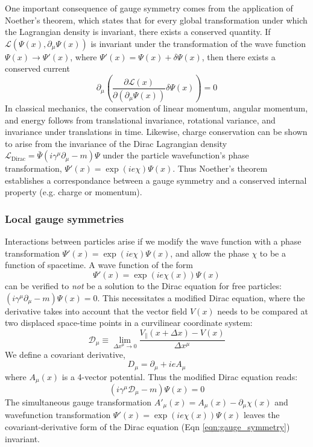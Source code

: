 \documentclass{article}
\begin{document}
One important consequence of gauge symmetry comes from the application of Noether's theorem, which states that for every global transformation under which the Lagrangian density is invariant, there exists a conserved quantity. If $\mathcal{L}(\Psi(x), \partial_\mu \Psi(x))$ is invariant under the transformation of the wave function $\Psi(x) \rightarrow \Psi'(x)$, where $\Psi'(x) = \Psi(x) + \delta \Psi(x)$, then there exists a conserved current 
\begin{equation}
    \partial_\mu \left( \frac{\partial\mathcal{L}(x)}{\partial(\partial_\mu \Psi(x))} \delta \Psi(x)  \right) = 0
\end{equation}
In classical mechanics, the conservation of linear momentum, angular momentum, and energy follows from translational invariance, rotational variance, and invariance under translations in time. Likewise, charge conservation can be shown to arise from the invariance of the Dirac Lagrangian density $\mathcal{L}_{\text{Dirac}} = \bar{\Psi} (i\gamma^\mu \partial_\mu -m)\Psi$ under the particle wavefunction's phase transformation, $\Psi'(x) = \exp(ie\chi) \Psi(x)$. Thus Noether's theorem establishes a correspondance between a gauge symmetry and a conserved internal property (e.g. charge or momentum).

\subsubsection{Local gauge symmetries}
Interactions between particles arise if we modify the wave function with a phase transformation $\Psi'(x) = \exp(i e \chi) \Psi(x)$, and allow the phase $\chi$ to be a function of spacetime. A wave function of the form
\begin{equation}
    \Psi'(x) = \exp(i e \chi(x)) \Psi(x)
\end{equation}
can be verified to \textit{not} be a solution to the Dirac equation for free particles: $(i \gamma^\mu \partial_\mu - m) \Psi(x) = 0$. This necessitates a modified Dirac equation, where the derivative takes into account that the vector field $V(x)$ needs to be compared at two displaced space-time points in a curvilinear coordinate system: 
\begin{equation}
    \mathcal{D}_\mu \equiv \lim_{\Delta x^\mu \rightarrow 0} \frac{V_{\parallel}(x + \Delta x) - V(x)}
{\Delta x^\mu}\end{equation}
We define a covariant derivative, 
\begin{equation}
    D_\mu = \partial_\mu + i e A_\mu
\label{eqn:modified_dirac}
\end{equation}
where $A_\mu(x)$ is a 4-vector potential. Thus the modified Dirac equation reads:
\begin{equation}
    \left( i \gamma^\mu \mathcal{D}_\mu - m  \right) \Psi(x) = 0
\end{equation}
The simultaneous gauge transformation $A'_\mu(x) = A_\mu(x) - \partial_\mu\chi(x)$ and wavefunction transformation $\Psi'(x) = \exp(ie\chi(x)) \Psi(x)$ leaves the covariant-derivative form of the Dirac equation (Eqn \ref{eqn:gauge_symmetry}) invariant.
\end{document}
